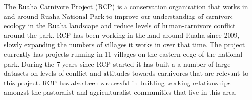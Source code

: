The Ruaha Carnivore Project (RCP) is a conservation organisation that works in and around Ruaha National Park to improve our understanding of carnivore ecology in the Ruaha landscape and reduce levels of human-carnivore conflict around the park. RCP has been working in the land around Ruaha since 2009, slowly expanding the numbers of villages it works in over that time. The project currently has projects running in 11 villages on the eastern edge of the national park. During the 7 years since RCP started it has built a a number of large datasets on levels of conflict and attitudes towards carnivores that are relevant to this project. RCP has also been successful in building working relationships amongst the pastoralist and agriculturalist communities that live in this area. \\